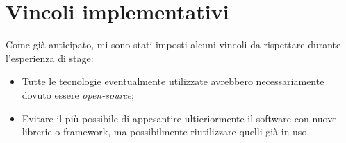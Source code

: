 \section{Vincoli implementativi} 
Come già anticipato, mi sono stati imposti alcuni vincoli da rispettare durante l'esperienza di stage:
\begin{itemize}
	\item Tutte le tecnologie eventualmente utilizzate avrebbero necessariamente dovuto essere \emph{open-source};
	\item Evitare il più possibile di appesantire ultieriormente il software con nuove librerie o framework, ma possibilmente riutilizzare quelli già in uso.
\end{itemize}

\newpage